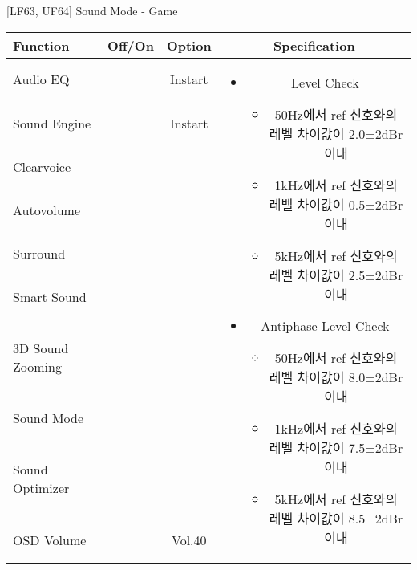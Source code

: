 \begin{frame}[t]{[LF63, UF64] Sound Mode - Game}
\begin{tiny}
\begin{tabular}{@{}lccc@{}}
\toprule
Function & Off/On & Option & Specification \\
\midrule
Audio EQ & \color{black}{Off} & Instart &
\multirow{10}{60mm}{
\begin{itemize}
\item Level Check
  \begin{itemize}
  \item 50Hz에서 ref 신호와의 레벨 차이값이 2.0±2dBr 이내
  \item 1kHz에서 ref 신호와의 레벨 차이값이 0.5±2dBr 이내
  \item 5kHz에서 ref 신호와의 레벨 차이값이 2.5±2dBr 이내
  \end{itemize}
\item Antiphase Level Check
  \begin{itemize}
  \item 50Hz에서 ref 신호와의 레벨 차이값이 8.0±2dBr 이내
  \item 1kHz에서 ref 신호와의 레벨 차이값이 7.5±2dBr 이내
  \item 5kHz에서 ref 신호와의 레벨 차이값이 8.5±2dBr 이내
  \end{itemize}
\end{itemize}
} \\
Sound Engine & \color{blue}{On} & Instart & \\
Clearvoice & \color{black}{Off} & & \\
Autovolume & \color{black}{Off} & & \\
Surround & \color{black}{Off} & & \\
Smart Sound & \color{black}{Off} & & \\
3D Sound Zooming & \color{black}{Off} & & \\
Sound Mode & \color{blue}{On} & \color{blue}{Game} & \\
Sound Optimizer & \color{black}{Off} & & \\
OSD Volume & \color{blue}{On} & Vol.40 & \\
\midrule
\end{tabular}
\end{tiny}

\end{frame}
